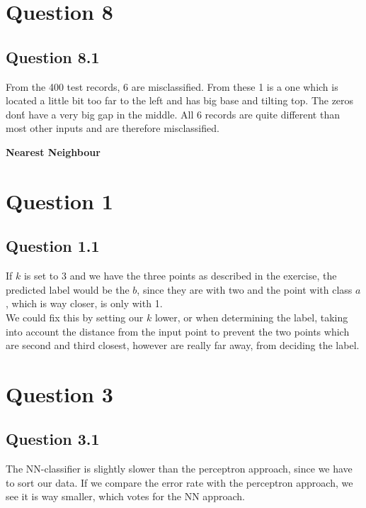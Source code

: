 \documentclass[11pt,twoside,a4paper]{article}
\begin{document}
\section{Question 8}

	\subsection{Question 8.1}
	From the 400 test records, 6 are misclassified. From these 1 is a one which is located a little bit too far to the left and has big base and tilting top. The zeros don\'t have a very big gap in the middle. All 6 records are quite different than most other inputs and are therefore misclassified.

\textbf{Nearest Neighbour}

\section{Question 1}

	\subsection{Question 1.1}
	If $k$ is set to 3 and we have the three points as described in the exercise, the predicted label would be the $b$, since they are with two and the point with class $a$, which is way closer, is only with 1. \\
	We could fix this by setting our $k$ lower, or when determining the label, taking into account the distance from the input point to prevent the two points which are second and third closest, however are really far away, from deciding the label.
	
\section{Question 3}

	\subsection{Question 3.1}
	The NN-classifier is slightly slower than the perceptron approach, since we have to sort our data. If we compare the error rate with the perceptron approach, we see it is way smaller, which votes for the NN approach.  

		
	
\begin{thebibliography}{9}
\end{thebibliography}
\end{document}
